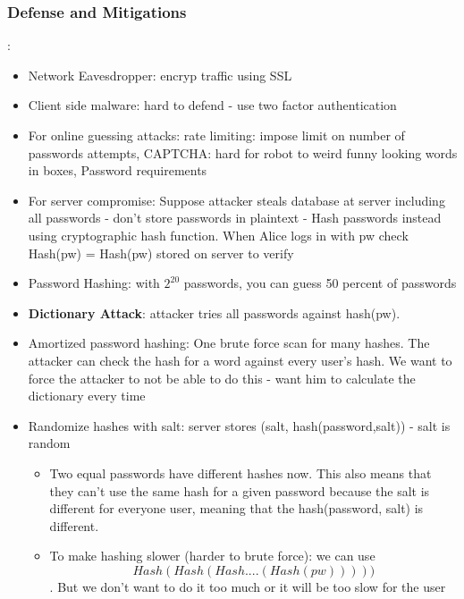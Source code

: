 \documentclass{article}
\begin{document}
\subsubsection{Defense and Mitigations}:
\begin{itemize}
\item Network Eavesdropper: encryp traffic using SSL
\item Client side malware: hard to defend - use two factor authentication
\item For online guessing attacks: rate limiting: impose limit on number of passwords attempts, CAPTCHA: hard for robot to weird funny looking words in boxes, Password requirements
\item For server compromise: Suppose attacker steals database at server including all passwords - don't store passwords in plaintext - Hash passwords instead using cryptographic hash function. When Alice logs in with pw check Hash(pw) = Hash(pw) stored on server to verify
\item Password Hashing: with $2^20$ passwords, you can guess 50 percent of passwords
\item \textbf{Dictionary Attack}: attacker tries all passwords against hash(pw).
\item Amortized password hashing: One brute force scan for many hashes. The attacker can check the hash for a word against every user's hash. We want to force the attacker to not be able to do this - want him to calculate the dictionary every time
\item Randomize hashes with salt: server stores (salt, hash(password,salt)) - salt is random
\begin{itemize}
\item Two equal passwords have different hashes now. This also means that they can't use the same hash for a given password because the salt is different for everyone user, meaning that the hash(password, salt) is different. 
\item To make hashing slower (harder to brute force): we can use $$Hash(Hash(Hash....(Hash(pw)))))$$. But we don't want to do it too much or it will be too slow for the user
\end{itemize}
\end{itemize}
\end{document}
